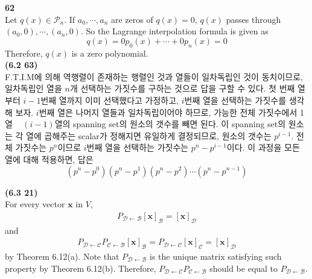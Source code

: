 \textbf{62} \\
Let $q(x) \in \mathscr{P}_n$. If $a_0, \cdots, a_n$ are zeros of $q(x) = 0$, $q(x)$ passes through $(a_0, 0), \cdots, (a_n, 0)$. So the Lagrange interpolation formula is given as \begin{equation*}
	q(x) = 0p_0(x) + \cdots + 0p_n(x) = 0
\end{equation*} Therefore, $q(x)$ is a zero polynomial. \\

\textbf{(6.2 63)} \\
F.T.I.M에 의해 역행렬이 존재하는 행렬인 것과 열들이 일차독립인 것이 동치이므로, 일차독립인 열을 $n$개 선택하는 가짓수를 구하는 것으로 답을 구할 수 있다. 첫 번째 열부터 $i-1$번째 열까지 이미 선택했다고 가정하고, $i$번째 열을 선택하는 가짓수를 생각해 보자. $i$번째 열은 나머지 열들과 일차독립이어야 하므로, 가능한 전체 가짓수에서 1열 ~ $(i-1)$열의 spanning set의 원소의 갯수를 빼면 된다. 이 spanning set의 원소는 각 열에 곱해주는 scalar가 정해지면 유일하게 결정되므로, 원소의 갯수는 $p^{i-1}$. 전체 가짓수는 $p^n$이므로 $i$번째 열을 선택하는 가짓수는 $p^n - p^{i-1}$이다. 이 과정을 모든 열에 대해 적용하면, 답은 \begin{equation*}
	(p^n - p^0)(p^n - p^1)(p^n - p^2)\cdots(p^n - p^{n-1})
\end{equation*}

\textbf{(6.3 21)} \\
For every vector $\textbf{x}$ in $V$, \begin{align*}
	P_{ \mathcal{D} \leftarrow \mathcal{B} }[\textbf{x}]_\mathcal{B} = [\textbf{x}]_\mathcal{D}
\end{align*} and \begin{align*}
	P_{ \mathcal{D} \leftarrow \mathcal{C} }P_{ \mathcal{C} \leftarrow \mathcal{B} }[\textbf{x}]_\mathcal{B} = P_{ \mathcal{D} \leftarrow \mathcal{C} }[\textbf{x}]_\mathcal{C} = [\textbf{x}]_\mathcal{D}
\end{align*} by Theorem 6.12(a). Note that $P_{ \mathcal{D} \leftarrow \mathcal{B} }$ is the unique matrix satisfying such property by Theorem 6.12(b). Therefore, $P_{ \mathcal{D} \leftarrow \mathcal{C} }P_{ \mathcal{C} \leftarrow \mathcal{B} }$ should be equal to $P_{ \mathcal{D} \leftarrow \mathcal{B} }$. \\

